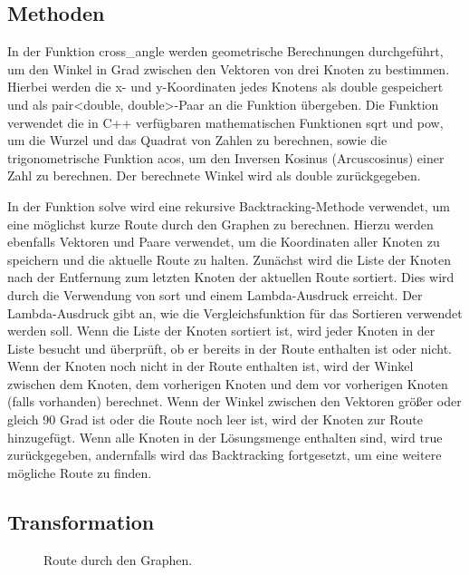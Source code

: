\documentclass[a4paper,10pt,ngerman]{scrartcl}
\begin{document}
    \subsection{Methoden}\label{subsec:methoden}
    In der Funktion cross\_angle werden geometrische Berechnungen durchgeführt, um den Winkel in Grad zwischen den Vektoren von drei Knoten zu bestimmen.
    Hierbei werden die x- und y-Koordinaten jedes Knotens als double gespeichert und als pair<double, double>-Paar an die Funktion übergeben.
    Die Funktion verwendet die in C++ verfügbaren mathematischen Funktionen sqrt und pow, um die Wurzel und das Quadrat von Zahlen zu berechnen,
    sowie die trigonometrische Funktion acos, um den Inversen Kosinus (Arcuscosinus) einer Zahl zu berechnen.
    Der berechnete Winkel wird als double zurückgegeben.
    \newline

    In der Funktion solve wird eine rekursive Backtracking-Methode verwendet, um eine möglichst kurze Route durch den Graphen zu berechnen.
    Hierzu werden ebenfalls Vektoren und Paare verwendet, um die Koordinaten aller Knoten zu speichern und die aktuelle Route zu halten.
    Zunächst wird die Liste der Knoten nach der Entfernung zum letzten Knoten der aktuellen Route sortiert.
    Dies wird durch die Verwendung von sort und einem Lambda-Ausdruck erreicht.
    Der Lambda-Ausdruck gibt an, wie die Vergleichsfunktion für das Sortieren verwendet werden soll.
    Wenn die Liste der Knoten sortiert ist, wird jeder Knoten in der Liste besucht und überprüft, ob er bereits in der Route enthalten ist oder nicht.
    Wenn der Knoten noch nicht in der Route enthalten ist, wird der Winkel zwischen dem Knoten, dem vorherigen Knoten und dem vor vorherigen Knoten (falls vorhanden) berechnet.
    Wenn der Winkel zwischen den Vektoren größer oder gleich 90 Grad ist oder die Route noch leer ist, wird der Knoten zur Route hinzugefügt.
    Wenn alle Knoten in der Lösungsmenge enthalten sind, wird true zurückgegeben, andernfalls wird das Backtracking fortgesetzt, um eine weitere mögliche Route zu finden.

    \subsection{Transformation}\label{subsec:transformation}

    \begin{figure}[htbp]
        \centering
        \caption{Route durch den Graphen.}\label{fig:figure}
    \end{figure}
\end{document}
